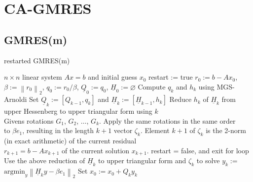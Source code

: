 \documentclass{scrartcl}
\newcommand{\norm}[1]{\left\lVert#1\right\rVert}
\begin{document}
\section{CA-GMRES} \label{sec:ca-gmres}


\subsection{GMRES(m)}
\begin{algorithm}[H]
\caption{restarted GMRES(m)}
\label{alg:gmres(m)}
\begin{algorithmic}[1]
    \REQUIRE $n \times n$ linear system $Ax = b$ and initial guess $x_0$
    \STATE restart := true
    	\STATE $r_0:=b - Ax_0$, $\beta := \norm{r_0}_2$, $q_0 := r_0/\beta$, $\underline{Q}_0 := q_0$, $\underline{H}_0 := \varnothing$
			\STATE Compute $q_k$ and $h_k$ using MGS-Arnoldi
			\STATE Set $\underline{Q}_k := [Q_{k-1},q_k]$ and $\underline{H}_k := [\underline{H}_{k -1}, h_k]$
			\STATE Reduce ${h_k}$ of $\underline{H}_k$ from upper Hessenberg to upper triangular form using $k$ \\
		\hspace{\algorithmicindent} Givens rotations $G_1$, $G_2$, $ \ldots$, $G_{k}$. Apply the same rotations in the same order \\ 
		\hspace{\algorithmicindent} to $\beta e_1$,  resulting in the length $k + 1$ vector $\zeta_{k}$.
			\STATE Element $k + 1$ of $\zeta_k$ is the 2-norm (in exact arithmetic) of the current residual \\
\hspace{\algorithmicindent} $r_{k + 1} = b - Ax_{k + 1}$ of the current solution $x_{k + 1}$.
			\STATE restart = false, and exit for loop		
		\ENDIF
		\ENDFOR
		\STATE Use the above reduction of $\underline{H}_k$ to upper triangular form and $\zeta_k$ to solve $y_k :=$ \\ \hspace{\algorithmicindent} $\text{argmin}_{y} \norm{\underline{H}_k y - \beta e_1}_2$
		\STATE Set $x_0 := x_0 + Q_k y_k$
	\ENDWHILE 
\end{algorithmic}
\end{algorithm}
\end{document}
